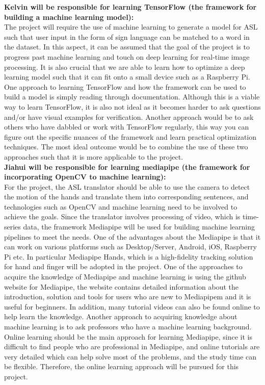 \documentclass[12pt]{article}
\begin{document}
\textbf{Kelvin will be responsible for learning TensorFlow (the framework for building a machine learning model):}\\
The project will require the use of machine learning to generate a model for ASL such that user input in the form of sign language
can be matched to a word in the dataset. In this aspect, it can be assumed that the goal of the project is to progress past machine
learning and touch on deep learning for real-time image processing. It is also crucial that we are able to learn how to optimize a deep
learning model such that it can fit onto a small device such as a Raspberry Pi. One approach to learning TensorFlow and how the framework
can be used to build a model is simply reading through documentation. Although this is a viable way to learn TensorFlow, it is also not
ideal as it becomes harder to ask questions and/or have visual examples for verification. Another approach would be to ask others who
have dabbled or work with TensorFlow regularly, this way you can figure out the specific nuances of the framework and learn practical
optimization techniques. The most ideal outcome would be to combine the use of these two approaches such that it is more applicable to the project.\\

\textbf{Jiahui will be responsible for learning mediapipe (the framework for incorporating OpenCV to machine learning):}\\
For the project, the ASL translator should be able to use the camera to detect the motion of the hands and translate 
them into corresponding sentences, and technologies such as OpenCV and machine learning need to be involved to achieve 
the goals.  Since the translator involves processing of video, which is time-series data, the framework Mediapipe will be 
used for building machine learning pipelines to meet the needs. One of the advantages about the Mediapipe is that it can work on various platforms such as Desktop/Server, 
Android, iOS, Raspberry Pi etc. In particular Mediapipe Hands, which is a high-fidelity tracking solution for hand and finger will be adopted in the project. One of the 
approaches to acquire the knowledge of Mediapipe and machine learning is using the github website for Mediapipe, the website contains detailed information about the 
introduction, solution and tools for users who are new to Mediapipem and it is useful for beginners. In addition, many tutorial videos can also be found online to help 
learn the knowledge. Another approach to acquiring knowledge about machine learning is to ask professors who have a machine learning background. Online learning should 
be the main approach for learning Mediapipe, since it is difficult to find people who are professional in Mediapipe, and online tutorials are very detailed which can help 
solve most of the problems, and the study time can be flexible. Therefore, the online learning approach will be pursued for this project.\\
\end{document}
